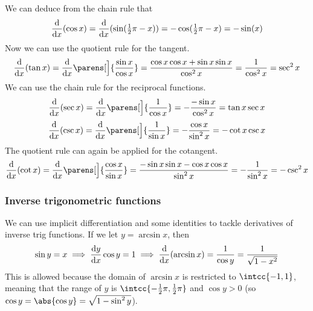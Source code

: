 We can deduce from the chain rule that
\begin{equation*}
    \dv{x}(\cos x) = \dv{x}(\sin(\tfrac 12 \pi - x))
                   = -\cos(\tfrac 12 \pi - x) = -\sin(x)
\end{equation*}
Now we can use the quotient rule for the tangent.
\begin{equation*}
    \dv{x}(\tan x) = \dv{x}\parens[\Big]{\frac{\sin x}{\cos x}}
                   = \frac{\cos x \cos x + \sin x \sin x}{\cos^2 x}
                   = \frac 1{\cos^2 x} = \sec^2 x
\end{equation*}
We can use the chain rule for the reciprocal functions.
\begin{equation*}
    \dv{x}(\sec x) = \dv{x}\parens[\Big]{\frac 1{\cos x}}
                   = -\frac{-\sin x}{\cos^2 x} = \tan x \sec x
\end{equation*}
\begin{equation*}
    \dv{x}(\csc x) = \dv{x}\parens[\Big]{\frac 1{\sin x}}
                   = -\frac{\cos x}{\sin^2 x} = -\cot x \csc x
\end{equation*}
The quotient rule can again be applied for the cotangent.
\begin{equation*}
    \dv{x}(\cot x) = \dv{x}\parens[\Big]{\frac{\cos x}{\sin x}}
                   = \frac{-\sin x \sin x - \cos x \cos x}{\sin^2 x}
                   = -\frac 1{\sin^2 x} = -\csc^2 x
\end{equation*}

\subsubsection{Inverse trigonometric functions} \label{sec_calc_trig_inv}

We can use implicit differentiation and some identities to tackle
derivatives of inverse trig functions. If we let \(y = \arcsin x\), then
\begin{equation*}
\sin y = x \implies \dv<y>{x} \cos y = 1
    \implies \dv{x}(\arcsin x) = \frac 1{\cos y} = \frac 1{\sqrt{1 - x^2}}
\end{equation*}
This is allowed because the domain of \(\arcsin x\) is restricted to
\(\intcc{-1, 1}\), meaning that the range of \(y\) is
\(\intcc{-\frac 12 \pi, \frac 12 \pi}\) and \(\cos y > 0\)
(so \(\cos y = \abs{\cos y} = \sqrt{1 - \sin^2 y}\)).

